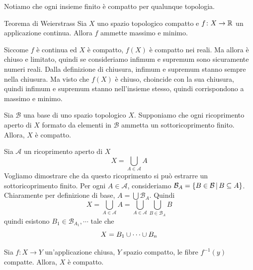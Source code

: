 \documentclass[a4paper]{article}
\begin{document}
Notiamo che ogni insieme finito è compatto per qualunque topologia.

\begin{snippetcorollary}{Teorema di Weierstrass}
    Sia \(X\) uno spazio topologico compatto e \(f \colon X \to \mathbb{R}\)
    un applicazione continua. Allora \(f\) ammette massimo e minimo.
\end{snippetcorollary}

\begin{snippetproof}{}
    Siccome \(f\) è continua ed \(X\) è compatto, \(f(X)\) è compatto nei reali.
    Ma allora è chiuso e limitato, quindi se consideriamo infimum e supremum
    sono sicuramente numeri reali.
    Dalla definizione di chiusura, infimum e supremum stanno sempre
    nella chiusura. Ma visto che \(f(X)\) è chiuso, choincide con la sua chiusura, quindi
    infimum e supremum stanno nell'insieme stesso, quindi corrispondono a massimo e minimo.
\end{snippetproof}

\begin{snippetproposition}{}
    Sia \(\mathcal{B}\) una base di uno spazio topologico \(X\).
    Supponiamo che ogni ricoprimento aperto di \(X\) formato da elementi
    in \(\mathcal{B}\) ammetta un sottoricoprimento finito.
    Allora, \(X\) è compatto.
\end{snippetproposition}

\begin{snippetproof}{}
    Sia \(\mathcal{A}\) un ricoprimento aperto di \(X\)
    \[
        X = \bigcup_{A \in \mathcal{A}} A
    \]
    Vogliamo dimostrare che da questo ricoprimento si può estrarre un sottoricoprimento finito.
    Per ogni \(A \in \mathcal{A}\), consideriamo \(\mathcal{B}_A = \{B \in \mathcal{B} \,|\, B \subseteq A\}\).
    Chiaramente per definizione di base, \(A = \bigcup \mathcal{B}_A\).
    Quindi
    \[
        X = \bigcup_{A \in \mathcal{A}} A =
        \bigcup_{A \in \mathcal{A}}
        \bigcup_{B \in \mathcal{B}_A} B
    \]
    quindi esistono \(B_1 \in \mathcal{B}_{A_1}, \cdots\)
    tale che
    \[
        X = B_1 \cup \cdots \cup B_n
    \]
\end{snippetproof}

\begin{snippettheorem}{}
    Sia \(f \colon X \to Y\) un'applicazione chiusa, \(Y\) spazio
    compatto, le fibre \(f^{-1}(y)\) compatte. Allora, \(X\) è compatto.
\end{snippettheorem}
\end{document}
